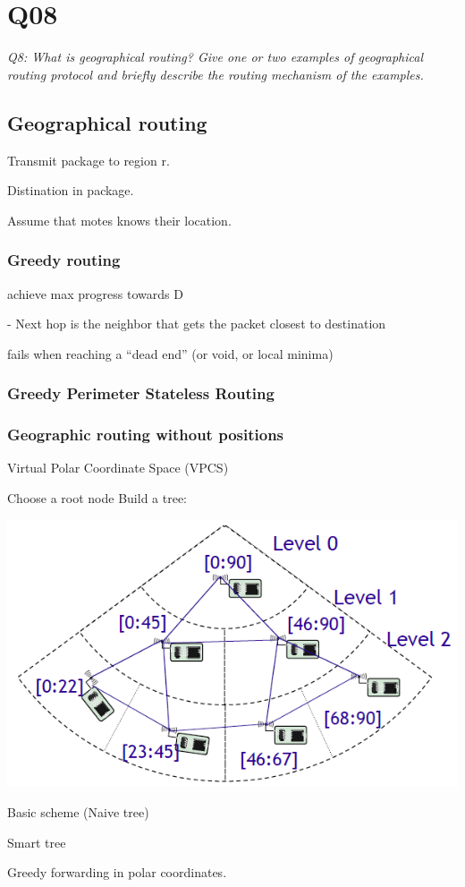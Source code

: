 \chapter{Q08}
\emph{Q8: What is geographical routing? Give one or two examples of
geographical routing protocol and briefly describe the routing mechanism of the
examples.}

\section{Geographical routing}

Transmit package to region r.

Distination in package.

Assume that motes knows their location.

\subsection{Greedy routing}

achieve max progress towards D

- Next hop is the neighbor that gets the packet closest to destination

fails when reaching a ``dead end'' (or void, or local minima)

\subsection{Greedy Perimeter Stateless Routing}

\subsection{Geographic routing without positions}

Virtual Polar Coordinate Space (VPCS)

Choose a root node
Build a tree:

\begin{center}
 \includegraphics[scale=0.5]{img/Routing-VPCS.png}
\end{center}

\begin{description}
	\item Basic scheme (Naive tree)
	\item Smart tree
	\item Greedy forwarding in polar coordinates.
\end{description}
